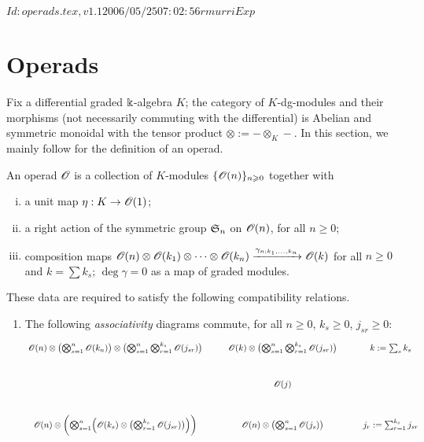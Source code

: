 \RCSID $Id: operads.tex,v 1.1 2006/05/25 07:02:56 rmurri Exp $



\chapter{Operads}
\label{cha:operads}

Fix a differential graded $\Bbbk$-algebra $K$; the category of
$K$-dg-modules and their morphisms (not necessarily commuting with the
differential) is Abelian and symmetric monoidal with the tensor product
$\otimes := - \otimes_K -$.  In this section, we mainly follow
\cite{kriz-may;operads} for the definition of an operad.
\begin{definition}
  \label{dfn:operad}
  An operad ${\mathscr{O}_{}}$ is a collection of $K$-modules $\{{\mathscr{O}_{}}(n)\}_{n\geqslant0}$
  together with 
  \begin{enumerate}[i)]
  \item a unit map $\eta:K \to {\mathscr{O}_{}}(1)$; 
  \item a right action of the symmetric group $\mathfrak{S}_{n}$ on ${\mathscr{O}_{}}(n)$,
    for all $n\geq0$;
  \item composition maps ${\mathscr{O}_{}}(n)\otimes{\mathscr{O}_{}}(k_1)\otimes\cdots\otimes{\mathscr{O}_{}}(k_n) \xrightarrow{\gamma_{n;
        k_1, \ldots, k_n}} {\mathscr{O}_{}}(k)$ for all $n\geq0$ and $k = \sum k_s$; $\deg \gamma
    = 0$ as a map of graded modules.
  \end{enumerate}
  These data are required to satisfy the following compatibility
  relations.
  \begin{enumerate}
  \item\label{o-ass} The following \emph{associativity} diagrams
    commute, for all $n\geq0$, $k_s \geq0$, $j_{sr}\geq0$:
    \begin{equation}
      {\xymatrix{%
          {\Oo}(n) \otimes \bigl( \bigotimes_{s=1}^n {\Oo}(k_n) \bigr) \otimes \bigl( \bigotimes_{s=1}^n
          \bigotimes_{r=1}^{k_s} {\Oo}(j_{sr}) \bigr) 
          &
          {\Oo}(k) \otimes \bigl(\bigotimes_{s=1}^n \bigotimes_{r=1}^{k_s} {\Oo}(j_{sr}) \bigr)
          &
          k := \sum_s k_s
          \\
          &
          {\Oo}(j)
          \\
          {\Oo}(n) \otimes \biggl( \bigotimes_{s=1}^n \Bigl( {\Oo}(k_s) \otimes \bigl(
          \bigotimes_{r=1}^{k_s} {\Oo}(j_{sr}) \bigr) \Bigr) \biggr)
          &
          {\Oo}(n) \otimes \bigl( \bigotimes_{s=1}^n {\Oo}(j_s) \bigr)
          &
          j_r := \sum_{r=1}^{k_s} j_{sr}
}}
\end{equation}
\end{enumerate}
\end{definition}
